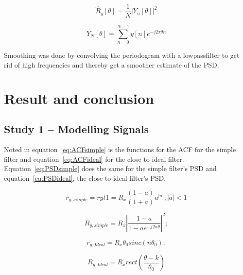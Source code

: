 \documentclass[10pt]{article}
\begin{document}
\begin{equation}
\label{eq:Peri}
\hat{R}_y[\theta] = \frac{1}{N}|Y_n[\theta]|^2
\end{equation}

\begin{equation}
\label{eq:YN}
Y_N[\theta] = \sum_{n=0}^{N-1}y[n]e^{-j2\pi\theta n}
\end{equation}

Smoothing was done by convolving the periodogram with a lowpassfilter to get rid of high frequencies and thereby get a smoother estimate of the PSD.

\section{Result and conclusion}
\subsection{Study 1 – Modelling Signals}

Noted in equation~\ref{eq:ACFsimple} is the functions for the ACF
for the simple filter and equation~\ref{eq:ACFideal} for the close to ideal filter.
Equation~\ref{eq:PSDsimple} does the same for the simple filter's PSD
and equation~\ref{eq:PSDideal}, the close to ideal filter's PSD.

\begin{equation}
  \label{eq:ACFsimple}
  r_{y,simple} = ryt1 = R_x\frac{(1-a)}{(1+a)}a^{|n|};  |a| < 1
\end{equation}

\begin{equation}
  \label{eq:PSDsimple}
  R_{y,simple} =  R_x|\frac{1-a}{1-ae^{-j2\pi\theta}}|^2;
\end{equation}

\begin{equation}
  \label{eq:ACFideal}
  r_{y,Ideal} = R_x\theta_{0}sinc(n\theta_0);
\end{equation}

\begin{equation}
  \label{eq:PSDideal}
  R_{y,Ideal} = R_xrect(\frac{\theta - k}{\theta_0})
\end{equation}
\clearpage
\end{document}
